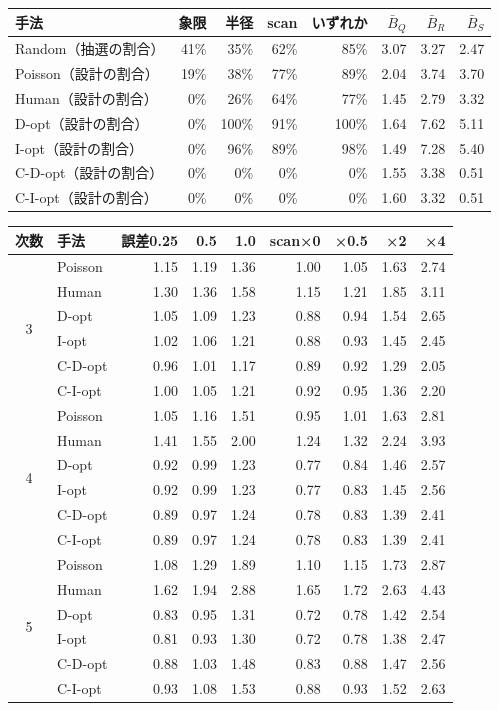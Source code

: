 \begin{tabular}{lrrrrrrr}
\toprule
手法 & 象限 & 半径 & scan & いずれか & $\bar{B}_Q$ & $\bar{B}_R$ & $\bar{B}_S$ \\
\midrule
Random（抽選の割合） & 41\% & 35\% & 62\% & 85\% & 3.07 & 3.27 & 2.47 \\
Poisson（設計の割合） & 19\% & 38\% & 77\% & 89\% & 2.04 & 3.74 & 3.70 \\
Human（設計の割合） & 0\% & 26\% & 64\% & 77\% & 1.45 & 2.79 & 3.32 \\
D-opt（設計の割合） & 0\% & 100\% & 91\% & 100\% & 1.64 & 7.62 & 5.11 \\
I-opt（設計の割合） & 0\% & 96\% & 89\% & 98\% & 1.49 & 7.28 & 5.40 \\
C-D-opt（設計の割合） & 0\% & 0\% & 0\% & 0\% & 1.55 & 3.38 & 0.51 \\
C-I-opt（設計の割合） & 0\% & 0\% & 0\% & 0\% & 1.60 & 3.32 & 0.51 \\
\bottomrule
\end{tabular}

\begin{tabular}{clrrrrrrr}
\toprule
次数 & 手法 & 誤差0.25 & 0.5 & 1.0 & scan×0 & ×0.5 & ×2 & ×4 \\
\midrule
\multirow{6}{*}{3} & Poisson & 1.15 & 1.19 & 1.36 & 1.00 & 1.05 & 1.63 & 2.74 \\
 & Human & 1.30 & 1.36 & 1.58 & 1.15 & 1.21 & 1.85 & 3.11 \\
 & D-opt & 1.05 & 1.09 & 1.23 & 0.88 & 0.94 & 1.54 & 2.65 \\
 & I-opt & 1.02 & 1.06 & 1.21 & 0.88 & 0.93 & 1.45 & 2.45 \\
 & C-D-opt & 0.96 & 1.01 & 1.17 & 0.89 & 0.92 & 1.29 & 2.05 \\
 & C-I-opt & 1.00 & 1.05 & 1.21 & 0.92 & 0.95 & 1.36 & 2.20 \\
\midrule
\multirow{6}{*}{4} & Poisson & 1.05 & 1.16 & 1.51 & 0.95 & 1.01 & 1.63 & 2.81 \\
 & Human & 1.41 & 1.55 & 2.00 & 1.24 & 1.32 & 2.24 & 3.93 \\
 & D-opt & 0.92 & 0.99 & 1.23 & 0.77 & 0.84 & 1.46 & 2.57 \\
 & I-opt & 0.92 & 0.99 & 1.23 & 0.77 & 0.83 & 1.45 & 2.56 \\
 & C-D-opt & 0.89 & 0.97 & 1.24 & 0.78 & 0.83 & 1.39 & 2.41 \\
 & C-I-opt & 0.89 & 0.97 & 1.24 & 0.78 & 0.83 & 1.39 & 2.41 \\
\midrule
\multirow{6}{*}{5} & Poisson & 1.08 & 1.29 & 1.89 & 1.10 & 1.15 & 1.73 & 2.87 \\
 & Human & 1.62 & 1.94 & 2.88 & 1.65 & 1.72 & 2.63 & 4.43 \\
 & D-opt & 0.83 & 0.95 & 1.31 & 0.72 & 0.78 & 1.42 & 2.54 \\
 & I-opt & 0.81 & 0.93 & 1.30 & 0.72 & 0.78 & 1.38 & 2.47 \\
 & C-D-opt & 0.88 & 1.03 & 1.48 & 0.83 & 0.88 & 1.47 & 2.56 \\
 & C-I-opt & 0.93 & 1.08 & 1.53 & 0.88 & 0.93 & 1.52 & 2.63 \\
\bottomrule
\end{tabular}

